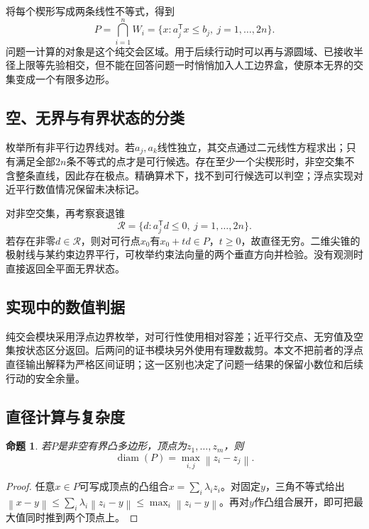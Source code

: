 \documentclass[UTF8,a4paper,12pt,fontset=fandol]{ctexart}
\newtheorem{proposition}{命题}[section]
\newcommand{\norm}[1]{\left\lVert#1\right\rVert}
\newcommand{\diam}{\operatorname{diam}}
\newcommand{\nextpage}{\clearpage}
\begin{document}
将每个楔形写成两条线性不等式，得到
\begin{equation}\label{eq:halfplanes}
 P=\bigcap_{i=1}^nW_i=\{x:a_j^\mathsf Tx\le b_j,\ j=1,\ldots,2n\}.
\end{equation}
问题一计算的对象是这个纯交会区域。用于后续行动时可以再与源圆域、已接收半径上限等先验相交，但不能在回答问题一时悄悄加入人工边界盒，使原本无界的交集变成一个有限多边形。

\subsection{空、无界与有界状态的分类}
枚举所有非平行边界线对。若$a_j,a_k$线性独立，其交点通过二元线性方程求出；只有满足全部$2n$条不等式的点才是可行候选。存在至少一个尖楔形时，非空交集不含整条直线，因此存在极点。精确算术下，找不到可行候选可以判空；浮点实现对近平行数值情况保留未决标记。

对非空交集，再考察衰退锥
\begin{equation}
 \mathcal R=\{d:a_j^\mathsf Td\le0,\ j=1,\ldots,2n\}.
\end{equation}
若存在非零$d\in\mathcal R$，则对可行点$x_0$有$x_0+td\in P$，$t\ge0$，故直径无穷。二维尖锥的极射线与某约束边界平行，可枚举约束法向量的两个垂直方向并检验。没有观测时直接返回全平面无界状态。

\subsection{实现中的数值判据}
纯交会模块采用浮点边界枚举，对可行性使用相对容差；近平行交点、无穷值及空集按状态区分返回。后两问的证书模块另外使用有理数裁剪。本文不把前者的浮点直径输出解释为严格区间证明；这一区别也决定了问题一结果的保留小数位和后续行动的安全余量。

\nextpage
\subsection{直径计算与复杂度}
\begin{proposition}\label{prop:diam}
若$P$是非空有界凸多边形，顶点为$z_1,\ldots,z_m$，则
\begin{equation}
 \diam(P)=\max_{i,j}\norm{z_i-z_j}.
\end{equation}
\end{proposition}
\begin{proof}
任意$x\in P$可写成顶点的凸组合$x=\sum_i\lambda_i z_i$。对固定$y$，三角不等式给出$\norm{x-y}\le\sum_i\lambda_i\norm{z_i-y}\le\max_i\norm{z_i-y}$。再对$y$作凸组合展开，即可把最大值同时推到两个顶点上。
\end{proof}
\end{document}
